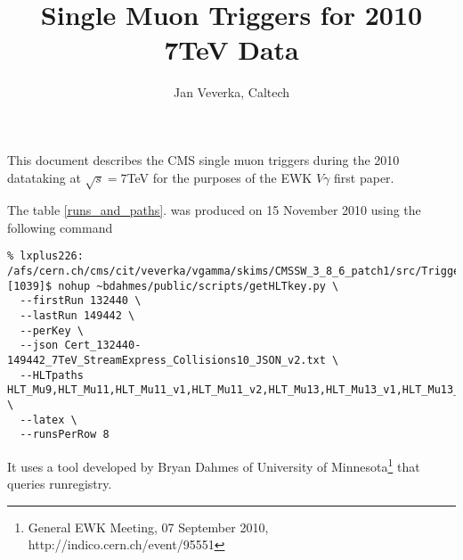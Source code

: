\documentclass[a4paper,10pt]{article}
\title{Single Muon Triggers for 2010 7TeV Data}
\author{Jan Veverka, Caltech}
\begin{document}
\maketitle
This document describes the CMS single muon triggers during the 2010 datataking at $\sqrt{s} = 7$TeV for the purposes of the EWK $V\gamma$ first paper.


The table \ref{runs_and_paths}. was produced on 15 November 2010 using the following command
\begin{verbatim}
% lxplus226: /afs/cern.ch/cms/cit/veverka/vgamma/skims/CMSSW_3_8_6_patch1/src/Trigger [1039]$ nohup ~bdahmes/public/scripts/getHLTkey.py \
  --firstRun 132440 \
  --lastRun 149442 \
  --perKey \
  --json Cert_132440-149442_7TeV_StreamExpress_Collisions10_JSON_v2.txt \
  --HLTpaths HLT_Mu9,HLT_Mu11,HLT_Mu11_v1,HLT_Mu11_v2,HLT_Mu13,HLT_Mu13_v1,HLT_Mu13_v2,HLT_Mu15,HLT_Mu15_v1,HLT_Mu15_v2 \
  --latex \
  --runsPerRow 8

\end{verbatim}
It uses a tool developed by Bryan Dahmes of University of Minnesota\footnote{General EWK Meeting, 07 September 2010, http://indico.cern.ch/event/95551} that queries runregistry.
\end{document}

